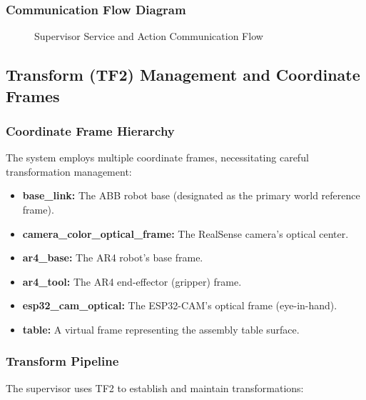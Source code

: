 \subsubsection{Communication Flow Diagram}

\begin{figure}[H]
    \centering
    \caption{Supervisor Service and Action Communication Flow}
    \label{fig:comm_flow}
\end{figure}

\subsection{Transform (TF2) Management and Coordinate Frames}

\subsubsection{Coordinate Frame Hierarchy}

The system employs multiple coordinate frames, necessitating careful transformation management:

\begin{itemize}
    \item \textbf{base\_link:} The ABB robot base (designated as the primary world reference frame).
    \item \textbf{camera\_color\_optical\_frame:} The RealSense camera's optical center.
    \item \textbf{ar4\_base:} The AR4 robot's base frame.
    \item \textbf{ar4\_tool:} The AR4 end-effector (gripper) frame.
    \item \textbf{esp32\_cam\_optical:} The ESP32-CAM's optical frame (eye-in-hand).
    \item \textbf{table:} A virtual frame representing the assembly table surface.
\end{itemize}

\subsubsection{Transform Pipeline}

The supervisor uses TF2 to establish and maintain transformations:

